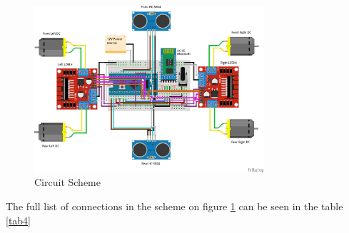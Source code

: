 \begin{figure}[htbp]
    \centerline{\includegraphics[width=8.5cm]{Images/Scheme.png}}
    \caption{Circuit Scheme}
    \label{fig6}
\end{figure}
 
The full list of connections in the scheme on figure \ref{fig6} can be seen in the table \ref{tab4}

